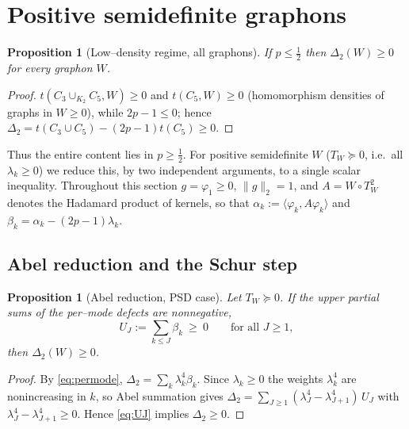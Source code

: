 \documentclass[11pt]{article}
\newtheorem{proposition}[theorem]{Proposition}
\theoremstyle{definition}
\newcommand{\tw}{T_W}
\begin{document}
\section{Positive semidefinite graphons}\label{sec:psd}

\begin{proposition}[Low--density regime, all graphons]\label{prop:lowp}
If $p\le\tfrac12$ then $\Delta_2(W)\ge0$ for every graphon $W$.
\end{proposition}

\begin{proof}
$t(C_3\cup_{K_2}C_5,W)\ge0$ and $t(C_5,W)\ge0$ (homomorphism densities of graphs
in $W\ge0$), while $2p-1\le0$; hence
$\Delta_2=t(C_3\cup C_5)-(2p-1)t(C_5)\ge0$.
\end{proof}

Thus the entire content lies in $p\ge\tfrac12$.  For positive semidefinite $W$
($\tw\succeq0$, i.e.\ all $\lambda_k\ge0$) we reduce this, by two independent
arguments, to a single scalar inequality.  Throughout this section
$g=\varphi_1\ge0$, $\|g\|_2=1$, and $A=W\circ\tw^2$ denotes the Hadamard product
of kernels, so that $\alpha_k:=\langle\varphi_k,A\varphi_k\rangle$ and
$\beta_k=\alpha_k-(2p-1)\lambda_k$.

\subsection{Abel reduction and the Schur step}

\begin{proposition}[Abel reduction, PSD case]\label{prop:abel}
Let $\tw\succeq0$.  If the upper partial sums of the per--mode defects are
nonnegative,
\begin{equation}\label{eq:UJ}
  U_J:=\sum_{k\le J}\beta_k\ \ge\ 0\qquad\text{for all }J\ge1,
\end{equation}
then $\Delta_2(W)\ge0$.
\end{proposition}

\begin{proof}
By \eqref{eq:permode}, $\Delta_2=\sum_k\lambda_k^4\beta_k$.  Since $\lambda_k\ge0$
the weights $\lambda_k^4$ are nonincreasing in $k$, so Abel summation gives
$\Delta_2=\sum_{J\ge1}(\lambda_J^4-\lambda_{J+1}^4)\,U_J$ with
$\lambda_J^4-\lambda_{J+1}^4\ge0$.  Hence \eqref{eq:UJ} implies $\Delta_2\ge0$.
\end{proof}
\end{document}

